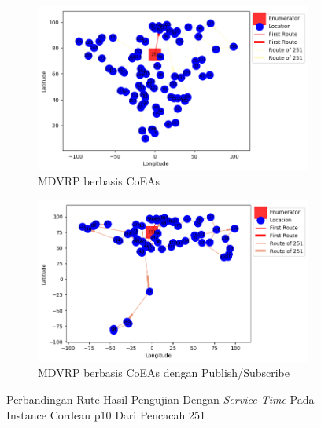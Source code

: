 \begin{figure}[H]
	\centering
	\begin{subfigure}[t]{\textwidth}
		\centering
		\includegraphics[width=\textwidth]{Resources/Images/cordeau_p10_tw/cordeau_p10_tw_251_coes}
		\caption{MDVRP berbasis CoEAs}
		\label{fig:cordeau_p10_tw_251_coes}
	\end{subfigure}
	\begin{subfigure}[t]{\textwidth}
		\centering
		\includegraphics[width=\textwidth]{Resources/Images/cordeau_p10_tw/cordeau_p10_tw_251_pubsub_coes}
		\caption{MDVRP berbasis CoEAs dengan Publish/Subscribe}
		\label{fig:cordeau_p10_tw_251_pubsub_coes}
	\end{subfigure}
	\caption{Perbandingan Rute Hasil Pengujian Dengan \textit{Service Time} Pada Instance Cordeau p10 Dari Pencacah 251}
	\label{fig:cordeau_p10_tw_251}
\end{figure}


